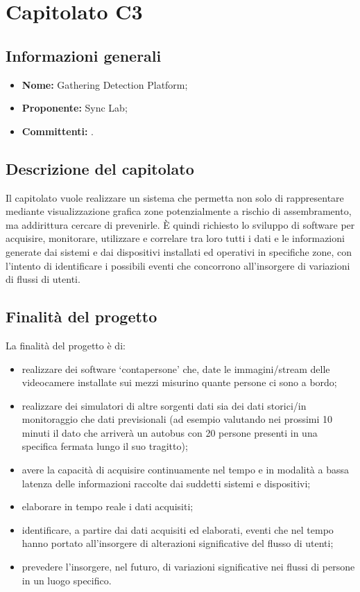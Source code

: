 \section{Capitolato C3}

\subsection{Informazioni generali}
\begin{itemize}
\item \textbf{Nome:} Gathering Detection Platform;
\item \textbf{Proponente:} Sync Lab;
\item \textbf{Committenti:} \committenti{}.
\end{itemize}

\subsection{Descrizione del capitolato}
Il capitolato vuole realizzare un sistema che permetta non solo di rappresentare mediante visualizzazione grafica zone potenzialmente a rischio di assembramento, ma addirittura cercare di prevenirle. È quindi richiesto lo sviluppo di software per acquisire, monitorare, utilizzare e correlare tra loro tutti i dati e le informazioni generate dai sistemi e dai dispositivi installati ed operativi in specifiche zone, con l'intento di identificare i possibili eventi che concorrono all'insorgere di variazioni di flussi di utenti. 

\subsection{Finalità del progetto}
La finalità del progetto è di:
\begin{itemize}
\item realizzare dei software ‘contapersone’ che, date le immagini/stream delle videocamere installate sui mezzi misurino quante persone ci sono a bordo;
\item realizzare dei simulatori di altre sorgenti dati sia dei dati storici/in monitoraggio che dati previsionali
(ad esempio valutando nei prossimi 10 minuti il dato che arriverà un autobus con 20 persone presenti
in una specifica fermata lungo il suo tragitto);
\item avere la capacità di acquisire continuamente nel tempo e in modalità a bassa latenza delle informazioni
raccolte dai suddetti sistemi e dispositivi;
\item elaborare in tempo reale i dati acquisiti;
\item identificare, a partire dai dati acquisiti ed elaborati, eventi che nel tempo hanno portato all'insorgere di alterazioni significative del flusso di utenti;
\item prevedere l'insorgere, nel futuro, di variazioni significative nei flussi di persone in un luogo specifico.
\end{itemize}

